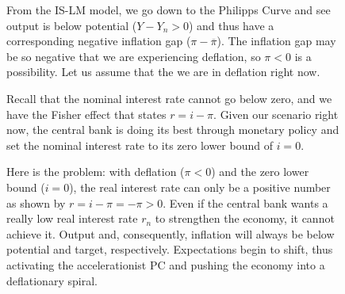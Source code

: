 \documentclass{extarticle}
\begin{document}
\begin{figure}[H]
\begin{minipage}{0.65\linewidth}
    \vspace{2mm}
    From the IS-LM model, we go down to the Philipps Curve and see output is below potential ($Y - Y_n > 0$) and thus have a corresponding negative inflation gap ($\pi - \overline{\pi}$). The inflation gap may be so negative that we are experiencing deflation, so $\pi < 0$ is a possibility. Let us assume that the we are in deflation right now.
    
    \vspace{2mm}
    Recall that the nominal interest rate cannot go below zero, and we have the Fisher effect that states $r = i - \pi$. Given our scenario right now, the central bank is doing its best through monetary policy and set the nominal interest rate to its zero lower bound of $i = 0$. 

    \vspace{2mm}
    Here is the problem: with deflation ($\pi < 0$) and the zero lower bound ($i = 0$), the real interest rate can only be a positive number as shown by $r = i - \pi = -\pi > 0$. Even if the central bank wants a really low real interest rate $r_n$ to strengthen the economy, it cannot achieve it. Output and, consequently, inflation will always be below potential and target, respectively.
    Expectations begin to shift, thus activating the accelerationist PC and pushing the economy into a deflationary spiral.

  \end{minipage} 
\end{figure}
\end{document}
